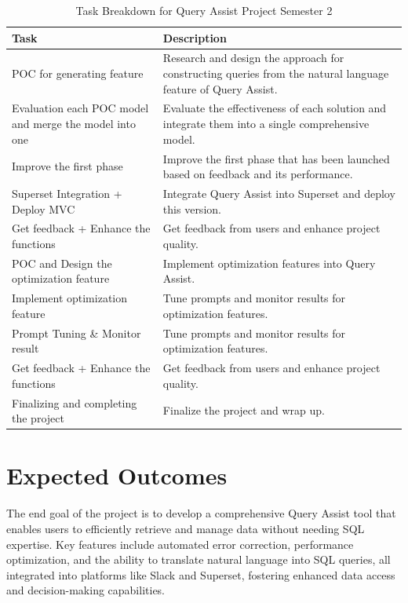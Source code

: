     \begin{table}[!h]
        \centering
        \caption{Task Breakdown for Query Assist Project Semester 2}
        \label{tbl:task-breakdown2}
        \begin{tabular}{|p{4cm}|p{10cm}|}
            \hline
            \textbf{Task} & \textbf{Description} \\
            \hline
            POC for generating feature & Research and design the approach for constructing queries from the natural language feature of Query Assist. \\
            \hline
            Evaluation each POC model and merge the model into one & Evaluate the effectiveness of each solution and integrate them into a single comprehensive model. \\
            \hline
            Improve the first phase & Improve the first phase that has been launched based on feedback and its performance. \\
            \hline
            Superset Integration + Deploy MVC & Integrate Query Assist into Superset and deploy this version. \\
            \hline
            Get feedback + Enhance the functions & Get feedback from users and enhance project quality. \\
            \hline
            POC and Design the optimization feature & Implement optimization features into Query Assist. \\
            \hline
            Implement optimization feature & Tune prompts and monitor results for optimization features. \\
            \hline
            Prompt Tuning \& Monitor result & Tune prompts and monitor results for optimization features. \\
            \hline
            Get feedback + Enhance the functions & Get feedback from users and enhance project quality. \\
            \hline
            Finalizing and completing the project & Finalize the project and wrap up. \\
            \hline
        \end{tabular}
    \end{table}
\pagebreak

\section{Expected Outcomes}
The end goal of the project is to develop a comprehensive Query Assist tool that enables users to efficiently retrieve and manage data without needing SQL expertise. Key features include automated error correction, performance optimization, and the ability to translate natural language into SQL queries, all integrated into platforms like Slack and Superset, fostering enhanced data access and decision-making capabilities.

